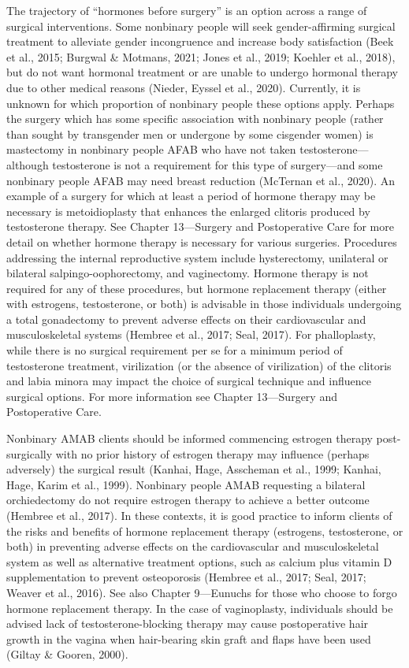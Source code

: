 \documentclass[
]{book}
\begin{document}
The trajectory of ``hormones before surgery'' is
an option across a range of surgical interventions.
Some nonbinary people will seek gender-affirming
surgical treatment to alleviate gender incongruence
and increase body satisfaction (Beek et al., 2015;
Burgwal \& Motmans, 2021; Jones et al., 2019;
Koehler et al., 2018), but do not want hormonal
treatment or are unable to undergo hormonal therapy due to other medical reasons (Nieder, Eyssel
et al., 2020). Currently, it is unknown for which
proportion of nonbinary people these options apply.
Perhaps the surgery which has some specific
association with nonbinary people (rather than
sought by transgender men or undergone by
some cisgender women) is mastectomy in nonbinary people AFAB who have not taken testosterone---although testosterone is not a requirement
for this type of surgery---and some nonbinary
people AFAB may need breast reduction
(McTernan et al., 2020). An example of a surgery
for which at least a period of hormone therapy
may be necessary is metoidioplasty that enhances
the enlarged clitoris produced by testosterone
therapy. See Chapter 13---Surgery and
Postoperative Care for more detail on whether
hormone therapy is necessary for various surgeries. Procedures addressing the internal reproductive system include hysterectomy, unilateral or
bilateral salpingo-oophorectomy, and vaginectomy.
Hormone therapy is not required for any of these
procedures, but hormone replacement therapy
(either with estrogens, testosterone, or both) is
advisable in those individuals undergoing a total
gonadectomy to prevent adverse effects on their
cardiovascular and musculoskeletal systems
(Hembree et al., 2017; Seal, 2017). For phalloplasty, while there is no surgical requirement
per se for a minimum period of testosterone
treatment, virilization (or the absence of virilization) of the clitoris and labia minora may impact
the choice of surgical technique and influence
surgical options. For more information see
Chapter 13---Surgery and Postoperative Care.

Nonbinary AMAB clients should be informed
commencing estrogen therapy post-surgically with
no prior history of estrogen therapy may influence
(perhaps adversely) the surgical result (Kanhai, Hage,
Asscheman et al., 1999; Kanhai, Hage, Karim et al.,
1999). Nonbinary people AMAB requesting a bilateral orchiedectomy do not require estrogen therapy
to achieve a better outcome (Hembree et al., 2017).
In these contexts, it is good practice to inform clients of the risks and benefits of hormone replacement therapy (estrogens, testosterone, or both) in
preventing adverse effects on the cardiovascular and
musculoskeletal system as well as alternative treatment options, such as calcium plus vitamin D supplementation to prevent osteoporosis (Hembree
et al., 2017; Seal, 2017; Weaver et al., 2016). See
also Chapter 9---Eunuchs for those who choose to
forgo hormone replacement therapy. In the case of
vaginoplasty, individuals should be advised lack of
testosterone-blocking therapy may cause postoperative hair growth in the vagina when hair-bearing
skin graft and flaps have been used (Giltay \&
Gooren, 2000).
\end{document}
